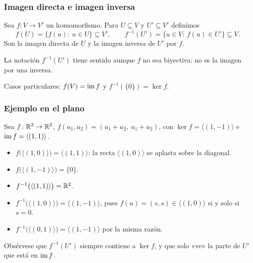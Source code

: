 
\begin{frame}
    \frametitle{Imagen directa e imagen inversa}

    \begin{definition}
        Sea $f\colon V\to V'$ un homomorfismo. Para $U\subseteq V$ y
        $U'\subseteq V'$ definimos
        \[
            f(U)=\{f(u):\ u\in U\}\subseteq V',
            \qquad
            f^{-1}(U')=\{u\in V:\ f(u)\in U'\}\subseteq V.
        \]
        Son la \alert{imagen directa} de $U$ y la \alert{imagen inversa}
        de $U'$ por $f$.
    \end{definition}

    \medskip

    La notación $f^{-1}(U')$ tiene sentido aunque $f$ \alert{no} sea
    biyectiva: no es la imagen por una inversa.

    \medskip

    Casos particulares: $f(V)=\operatorname{im} f$ y $f^{-1}(\{0\})=\ker f$.
\end{frame}


\begin{frame}
    \frametitle{Ejemplo en el plano}

    \begin{example}
        Sea $f\colon\mathbb{R}^2\to\mathbb{R}^2$, $f(u_1,u_2)=(u_1+u_2,\ u_1+u_2)$, con
        $\ker f=\langle(1,-1)\rangle$ e $\operatorname{im} f=\langle(1,1)\rangle$.
        \begin{itemize}
            \item $f\bigl(\langle(1,0)\rangle\bigr)=\langle(1,1)\rangle$:
            la recta $\langle(1,0)\rangle$ se aplasta sobre la diagonal.
            \item $f\bigl(\langle(1,-1)\rangle\bigr)=\{0\}$.
            \item $f^{-1}\bigl(\langle(1,1)\rangle\bigr)=\mathbb{R}^2$.
            \item $f^{-1}\bigl(\langle(1,0)\rangle\bigr)=\langle(1,-1)\rangle$,
            pues $f(u)=(s,s)\in\langle(1,0)\rangle$ si y solo si $s=0$.
            \item $f^{-1}\bigl(\langle(0,1)\rangle\bigr)=\langle(1,-1)\rangle$
            por la misma razón.
        \end{itemize}
    \end{example}

    Obsérvese que $f^{-1}(U')$ siempre contiene a $\ker f$, y que solo
    «ve» la parte de $U'$ que está en $\operatorname{im} f$.
\end{frame}


